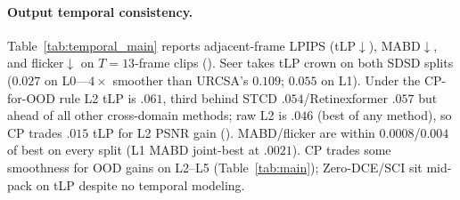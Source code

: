\paragraph{Output temporal consistency.} Table~\ref{tab:temporal_main} reports adjacent-frame LPIPS (tLP$\downarrow$), MABD$\downarrow$, and flicker$\downarrow$ on $T{=}13$-frame clips (). Seer takes tLP crown on both SDSD splits ($0.027$ on L0---$4{\times}$ smoother than URCSA's $0.109$; $0.055$ on L1). Under the CP-for-OOD rule L2 tLP is $.061$, third behind STCD $.054$/Retinexformer $.057$ but ahead of all other cross-domain methods; raw L2 is $.046$ (best of any method), so CP trades $.015$ tLP for L2 PSNR gain (). MABD/flicker are within $0.0008$/$0.004$ of best on every split (L1 MABD joint-best at $.0021$). CP trades some smoothness for OOD gains on L2--L5 (Table~\ref{tab:main}); Zero-DCE/SCI sit mid-pack on tLP despite no temporal modeling.

